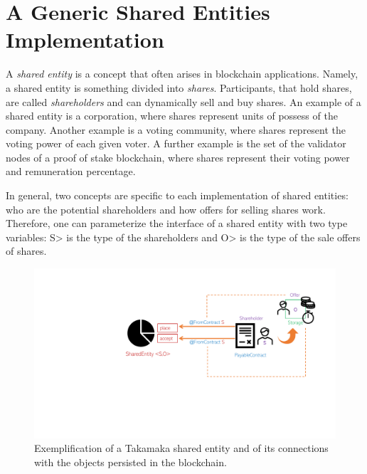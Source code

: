 \section{A Generic Shared Entities Implementation}\label{sec:shared_entities}

A \emph{shared entity} is a concept that often arises in blockchain
applications. Namely, a shared entity is something divided into \emph{shares}. Participants,
that hold shares, are called \emph{shareholders} and can dynamically
sell and buy shares. An example of a shared entity is a corporation,
where shares represent units of possess of the company. Another example is
a voting community, where shares represent the voting power of each given voter.
A further example is the set of the validator nodes of a proof of stake blockchain,
where shares represent their voting power and remuneration percentage.

In general, two concepts are specific to each implementation of shared entities:
who are the potential shareholders and how offers for selling shares work.
Therefore, one can parameterize the interface of a shared entity with two type variables:
\<S> is the type of the shareholders and \<O> is the type of the sale offers of shares.

\begin{figure}[ht]
\centering
\includegraphics[width=\linewidth]{figures/shared_entity}
\caption{Exemplification of a Takamaka shared entity and of its connections with the objects persisted in the blockchain.}
\label{figure.shared_entity}
\end{figure}

